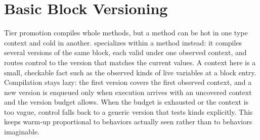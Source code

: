 \section{Basic Block Versioning}
\label{sec:ch34-bbv}

Tier promotion compiles whole methods, but a method can be hot in one type context and cold in another.
 specializes within a method instead: it compiles several versions of the same block, each valid under one observed context, and routes control to the version that matches the current values.
A context here is a small, checkable fact such as the observed kinds of live variables at a block entry.
Compilation stays lazy: the first version covers the first observed context, and a new version is enqueued only when execution arrives with an uncovered context and the version budget allows.
When the budget is exhausted or the context is too vague, control falls back to a generic version that tests kinds explicitly.
This keeps warm-up proportional to behaviors actually seen rather than to behaviors imaginable.


